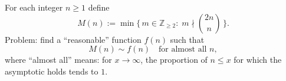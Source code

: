 For each integer $n\ge 1$ define
\[
M(n):=\min\{\,m\in\mathbb Z_{\ge 2}:\; m\nmid \binom{2n}{n}\,\}.
\]
Problem: find a ``reasonable'' function $f(n)$ such that
\[
M(n)\sim f(n)\quad\text{for almost all }n,
\]
where ``almost all'' means: for $x\to\infty$, the proportion of $n\le x$ for which the asymptotic holds tends to $1$.
